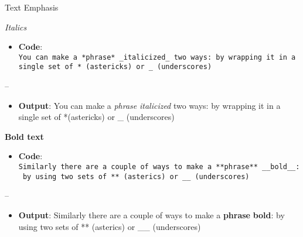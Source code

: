 \documentclass[
  ignorenonframetext,
]{beamer}
\providecommand{\tightlist}{%
  \setlength{\itemsep}{0pt}\setlength{\parskip}{0pt}}
\begin{document}
\begin{frame}[fragile]{Text Emphasis}
\protect\hypertarget{text-emphasis}{}

\begin{block}{\emph{Italics}}

\begin{itemize}
\tightlist
\item
  \textbf{Code}:
  \texttt{You\ can\ make\ a\ *phrase*\ \_italicized\_\ two\ ways:\ by\ wrapping\ it\ in\ a\ single\ set\ of\ *\ (astericks)\ or\ \_\ (underscores)}
\end{itemize}

--

\begin{itemize}
\tightlist
\item
  \textbf{Output}: You can make a \emph{phrase} \emph{italicized} two
  ways: by wrapping it in a single set of *(astericks) or \_
  (underscores)
\end{itemize}

\end{block}

\begin{block}{\textbf{Bold text}}

\begin{itemize}
\tightlist
\item
  \textbf{Code}:
  \texttt{Similarly\ there\ are\ a\ couple\ of\ ways\ to\ make\ a\ **phrase**\ \_\_bold\_\_:\ by\ using\ two\ sets\ of\ **\ (asterics)\ or\ \_\_\ (underscores)}
\end{itemize}

--

\begin{itemize}
\tightlist
\item
  \textbf{Output}: Similarly there are a couple of ways to make a
  \textbf{phrase} \textbf{bold}: by using two sets of ** (asterics) or
  \_\_ (underscores)
\end{itemize}

\end{block}

\end{frame}
\end{document}
